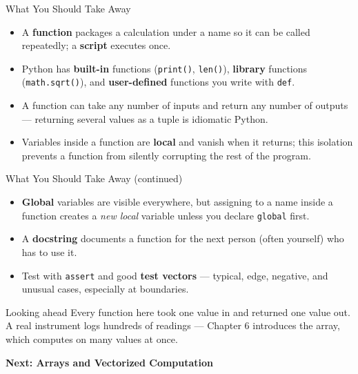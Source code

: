 \documentclass[9pt,aspectratio=169,xcolor=table]{beamer}
\begin{document}
\begin{frame}{What You Should Take Away}
    \leavevmode
    \small
    \begin{itemize}
        \item A \textbf{function} packages a calculation under a name so
              it can be called repeatedly; a \textbf{script} executes
              once.
        \item Python has \textbf{built-in} functions (\texttt{print()},
              \texttt{len()}), \textbf{library} functions
              (\texttt{math.sqrt()}), and \textbf{user-defined}
              functions you write with \texttt{def}.
        \item A function can take any number of inputs and return any
              number of outputs --- returning several values as a tuple
              is idiomatic Python.
        \item Variables inside a function are \textbf{local} and vanish
              when it returns; this isolation prevents a function from
              silently corrupting the rest of the program.
    \end{itemize}
\end{frame}

\begin{frame}{What You Should Take Away (continued)}
    \leavevmode
    \small
    \begin{itemize}
        \item \textbf{Global} variables are visible everywhere, but
              assigning to a name inside a function creates a
              \emph{new local} variable unless you declare
              \texttt{global} first.
        \item A \textbf{docstring} documents a function for the next
              person (often yourself) who has to use it.
        \item Test with \texttt{assert} and good \textbf{test vectors}
              --- typical, edge, negative, and unusual cases, especially
              at boundaries.
    \end{itemize}

    \vspace{3mm}
    \begin{alertblock}{Looking ahead}
        Every function here took one value in and returned one value
        out. A real instrument logs hundreds of readings --- Chapter 6
        introduces the \alert{array}, which computes on many values at
        once.
    \end{alertblock}

    \vspace{3mm}
    \begin{center}
        \large\color{primary}\textbf{Next: Arrays and Vectorized Computation}
    \end{center}
\end{frame}
\end{document}
